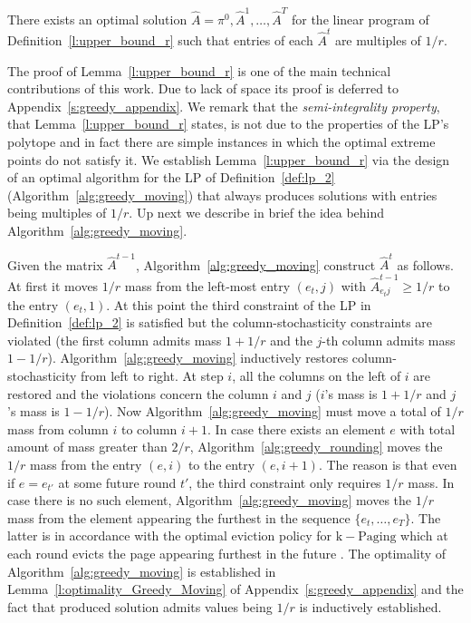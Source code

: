 \documentclass[a4paper,UKenglish,cleveref,autoref, thm-restate]{lipics-v2019}
\begin{document}
\begin{lemma}\label{l:upper_bound_r}
There exists an optimal solution $\hat{A} = \pi^0,\hat{A}^1,\ldots,\hat{A}^T$ for the linear program of Definition~\ref{l:upper_bound_r} such that entries of each $\hat{A}^t$ are multiples of $1/r$.
\end{lemma}
The proof of Lemma~\ref{l:upper_bound_r} is one of the main technical contributions of this work. Due to lack of space its proof is deferred to  Appendix~\ref{s:greedy_appendix}. We remark that the \textit{semi-integrality property}, that Lemma~\ref{l:upper_bound_r} states, is not due to the properties of the LP's polytope and in fact there are simple instances in which the optimal extreme points do not satisfy it. We establish Lemma~\ref{l:upper_bound_r} via the design of an optimal algorithm for the LP of Definition~\ref{def:lp_2} (Algorithm~\ref{alg:greedy_moving}) that always produces solutions with entries being multiples of $1/r$. Up next we describe in brief the idea behind Algorithm~\ref{alg:greedy_moving}.

Given the matrix $\hat{A}^{t-1}$, Algorithm~\ref{alg:greedy_moving} construct $\hat{A}^t$ as follows. 
At first it moves $1/r$ mass from the left-most entry $(e_t,j)$ with
$\hat{A}^{t-1}_{e_t j} \geq 1/r$ to the entry $(e_t,1)$. At this point the third constraint of the LP in Definition~\ref{def:lp_2} is satisfied but the column-stochasticity constraints are violated (the first column admits mass $1+1/r$ and the $j$-th column admits mass $1-1/r$). Algorithm~\ref{alg:greedy_moving} inductively restores column-stochasticity from left to right. At step $i$, all the columns on the left of $i$ are restored and the violations concern the column $i$ and $j$ ($i$'s mass is $1+1/r$ and $j$'s mass is $1-1/r$). Now Algorithm~\ref{alg:greedy_moving} must move a total of $1/r$ mass from column $i$ to column $i+1$. In case there exists an element $e$ with total amount of mass greater than $2/r$, Algorithm~\ref{alg:greedy_rounding} moves the $1/r$ mass from the entry $(e,i)$ to the entry $(e,i+1)$. The reason is that even if $e = e_{t'}$
at some future round $t'$, the third constraint only requires $1/r$ mass. In case there is no such element, Algorithm~\ref{alg:greedy_moving} moves the $1/r$ mass from the element appearing the furthest in the sequence $\{e_t,\ldots,e_T\}$. The latter is in accordance with the optimal eviction policy for $\mathrm{k}-\mathrm{Paging}$ which at each round evicts the page appearing furthest in the future \cite{BBN12}. The optimality of Algorithm~\ref{alg:greedy_moving} is established in Lemma~\ref{l:optimality_Greedy_Moving} of Appendix~\ref{s:greedy_appendix} and the fact that produced solution admits values being $1/r$ is inductively established. 
\end{document}
